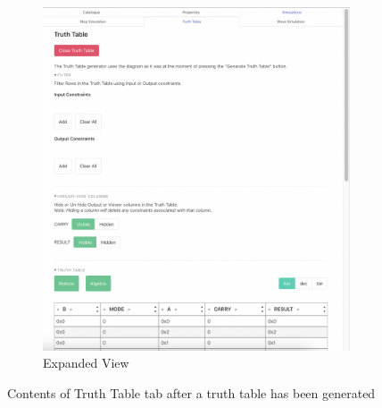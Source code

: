 \begin{figure}[h]
\begin{subfigure}[b]{0.48\textwidth}
         \includegraphics[width=\textwidth]{04.AnalysisDesign/expanded.png}
         \caption{Expanded View}
         \label{fig:expand}
     \end{subfigure}
        \caption{Contents of Truth Table tab after a truth table has been generated}
        \label{fig:tttab}
\end{figure}

